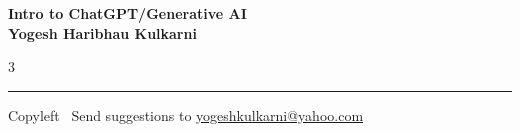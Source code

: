 \documentclass[8pt,landscape]{article}
\begin{document}
\footnotesize


\begin{center}
\Large{\textbf{Intro to ChatGPT/Generative AI\\ Yogesh Haribhau Kulkarni}}
\end{center}

\begin{multicols}{3}

\end{multicols}

\rule{\linewidth}{0.25pt}
\scriptsize
Copyleft \textcopyleft\  Send suggestions to
\href{http://www.yogeshkulkarni.com}{yogeshkulkarni@yahoo.com}
\end{document}
